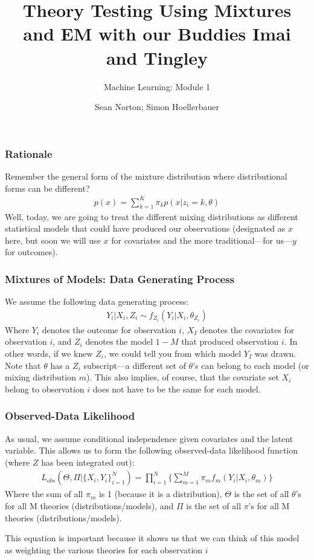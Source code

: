 \documentclass{beamer}
\title{Theory Testing Using Mixtures and EM with our Buddies Imai and Tingley}
\subtitle{Machine Learning: Module 1}
\author{Sean Norton; Simon Hoellerbauer}
\begin{document}
\begin{frame}
	\titlepage
\end{frame}

\begin{frame}
\frametitle{Rationale}
Remember the general form of the mixture distribution where distributional forms can be different?
	\begin{align}
	p(x) = \sum_{k=1}^{K} \pi_k p (x | z_i = k, \theta)
	\end{align}
Well, today, we are going to treat the different mixing distributions as different statistical models that could have produced our observations (designated as $x$ here, but soon we will use $x$ for covariates and the more traditional---for us---$y$ for outcomes).
\end{frame}


\begin{frame}
\frametitle{Mixtures of Models: Data Generating Process}
We assume the following data generating process:
\begin{align}
	Y_i|X_i, Z_i \sim f_{Z_i}(Y_i|X_i, \theta_{Z_i})
\end{align}
Where $Y_i$ denotes the outcome for observation $i$, $X_I$ denotes the covariates for observation $i$, and $Z_i$ denotes the model $1-M$ that produced observation $i$. In other words, if we knew $Z_i$, we could tell you from which model $Y_I$ was drawn. Note that $\theta$ has a $Z_i$ subscript---a different set of $\theta$'s can belong to each model (or mixing distribution $m$). This also implies, of course, that the covariate set $X_i$ belong to observation $i$ does not have to be the same for each model. 
\end{frame}

\begin{frame}
\frametitle{Observed-Data Likelihood}
As usual, we assume conditional independence given covariates and the latent variable. This allows us to form the following observed-data likelihood function (where $Z$ has been integrated out):
\begin{align}
	L_{obs}(\Theta,\Pi|\{X_i, Y_i\}^N_{i=1}) = \prod^N_{i=1}\bigg\{\sum^M_{m=1}\pi_m f_m(Y_i|X_i, \theta_m) \bigg\}
\end{align}
Where the sum of all $\pi_m$ is 1 (because it is a distribution), $\Theta$ is the set of all $\theta$'s for all M theories (distributions/models), and $\Pi$ is the set of all $\pi$'s for all M theories (distributions/models).

This equation is important because it shows us that we can think of this model as weighting the various theories for each observation $i$
\end{frame}
\end{document}
